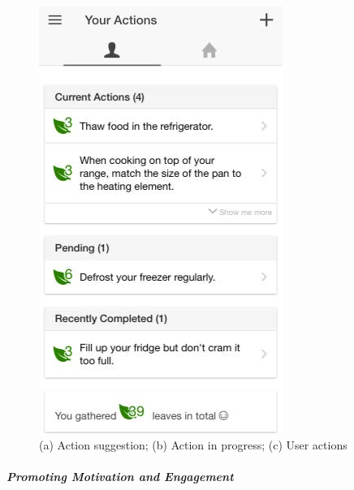 \begin{figure}[b!]
\begin{center}
\begin{minipage}[t!]{0.33\linewidth}
         \includegraphics[width=1\linewidth]{img/action_tab.jpg}    
        \end{minipage}
      \end{center}
      \caption{(a) Action suggestion; (b) Action in progress; (c) User actions}\label{fig:actions}
\end{figure}


\subparagraph{Promoting Motivation and Engagement}

